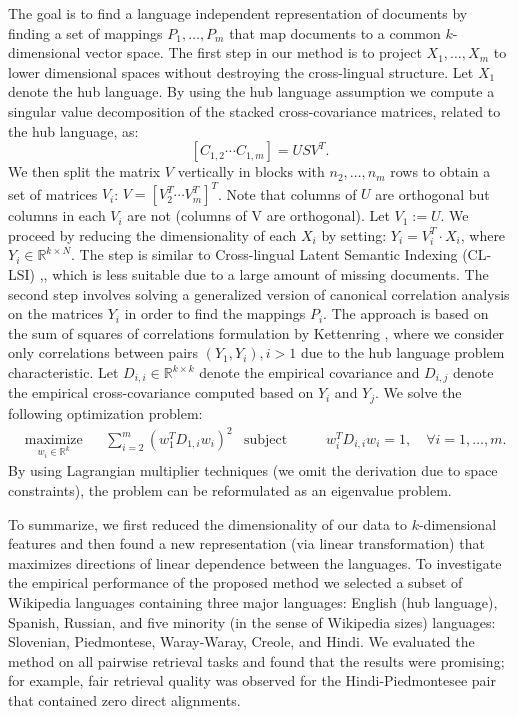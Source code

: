 \documentclass{article} %
\newcommand{\RR}{\mathbb{R}}
\begin{document}
The goal is to find a language independent representation of documents by finding a set of mappings $P_1 ,\ldots, P_m$ that map documents to a common $k$-dimensional vector space. The first step in our method is to project $X_1, \ldots, X_m$ to lower dimensional spaces without destroying the cross-lingual structure. Let $X_1$ denote the hub language. By using the hub language assumption we compute a singular value decomposition of the stacked cross-covariance matrices, related to the hub language, as:
$$[C_{1,2} \cdots C_{1,m}] = U S V^T.$$
We then split the matrix $V$ vertically in blocks with $n_2, \ldots, n_m$ rows to obtain a set of matrices $V_i$: $V = [V_2^T  \cdots  V_m^T]^T$. Note that columns of $U$ are orthogonal but columns in each $V_i$ are not (columns of V are orthogonal). Let $V_1 := U$. We proceed by reducing the dimensionality of each $X_i$ by setting: $Y_i = V_i^T \cdot X_i$, where $Y_i \in \RR^{k\times N}$. The step is similar to Cross-lingual Latent Semantic Indexing (CL-LSI) \cite{lsi},\cite{cl_lsi}, which is less suitable due to a large amount of missing documents. The second step involves solving a generalized version of canonical correlation analysis on the matrices $Y_i$ in order to find the mappings $P_i$. The approach is based on the sum of squares of correlations formulation by Kettenring \cite{Kettenring}, where we consider only correlations between pairs $(Y_1, Y_i), i >1$ due to the hub language problem characteristic.  Let $D_{i,i} \in \RR^{k \times k}$ denote the empirical covariance and $D_{i,j}$ denote the empirical cross-covariance computed based on $Y_i$ and $Y_j$. We solve the following optimization problem:
\begin{equation*}
\begin{aligned}
& \underset{w_i \in \RR^{k}}{\text{maximize}}
& & \sum_{i = 2}^m  \left(w_1^T D_{1,i} w_i \right)^2
& \text{subject to}
& & w_i^T D_{i,i} w_i = 1, \quad\forall i = 1,\ldots, m.
\end{aligned}
\end{equation*}
By using Lagrangian multiplier techniques (we omit the derivation due to space constraints), the problem can be reformulated as an eigenvalue problem.

To summarize, we first reduced the dimensionality of our data to $k$-dimensional features and then found a new representation (via linear transformation) that maximizes directions of linear dependence between the languages. To investigate the empirical performance of the proposed method we selected a subset of Wikipedia languages containing three major languages: English (hub language), Spanish, Russian, and five minority (in the sense of Wikipedia sizes) languages: Slovenian, Piedmontese, Waray-Waray, Creole, and Hindi. We evaluated the method on all pairwise retrieval tasks and found that the results were promising; for example, fair retrieval quality was observed for the Hindi-Piedmontesee pair that contained zero direct alignments.
\end{document}
